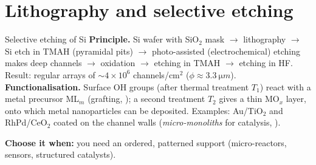 \section{Lithography and selective etching}
\begin{cardbox}{Selective etching of Si }
\textbf{Principle.} Si wafer with SiO$_2$ mask $\to$ lithography $\to$ Si etch in TMAH (pyramidal pits)
$\to$ photo-assisted (electrochemical) etching makes deep channels $\to$ oxidation $\to$ etching in TMAH
$\to$ etching in HF. Result: regular arrays of $\sim4\times10^6$ channels/cm$^2$ ($\phi\approx\SI{3.3}{\micro m}$).\\
\textbf{Functionalisation.} Surface OH groups (after thermal treatment $T_1$) react with a metal precursor
ML$_m$ (grafting, ); a second treatment $T_2$ gives a thin MO$_x$ layer, onto which metal nanoparticles
can be deposited. Examples: Au/TiO$_2$ and RhPd/CeO$_2$ coated on the channel walls (\emph{micro-monoliths}
for catalysis, ).
\end{cardbox}
\textbf{Choose it when:} you need an ordered, patterned support (micro-reactors, sensors, structured catalysts).
